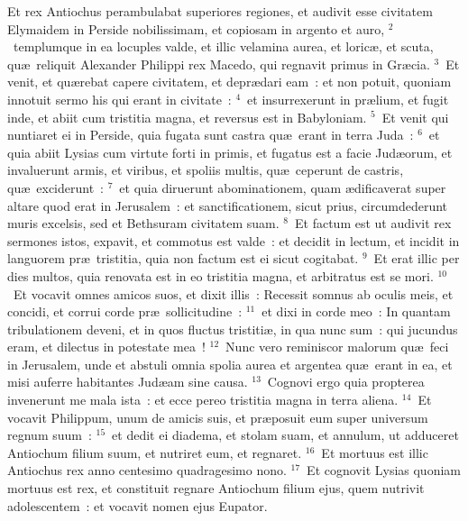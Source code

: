 \lettrine[lines=3,image=true,loversize=0.05,lraise=-0.03]{E}{}t rex Antiochus perambulabat superiores regiones, et audivit esse civitatem Elymaidem in Perside nobilissimam, et copiosam in argento et auro,
${}^{2}$~templumque in ea locuples valde, et illic velamina aurea, et loric\ae , et scuta, qu\ae\ reliquit Alexander Philippi rex Macedo, qui regnavit primus in Gr\ae cia.
${}^{3}$~Et venit, et qu\ae rebat capere civitatem, et depr\ae dari eam~: et non potuit, quoniam innotuit sermo his qui erant in civitate~:
${}^{4}$~et insurrexerunt in pr\ae lium, et fugit inde, et abiit cum tristitia magna, et reversus est in Babyloniam.
${}^{5}$~Et venit qui nuntiaret ei in Perside, quia fugata sunt castra qu\ae\ erant in terra Juda~:
${}^{6}$~et quia abiit Lysias cum virtute forti in primis, et fugatus est a facie Jud\ae orum, et invaluerunt armis, et viribus, et spoliis multis, qu\ae\ ceperunt de castris, qu\ae\ exciderunt~:
${}^{7}$~et quia diruerunt abominationem, quam \ae dificaverat super altare quod erat in Jerusalem~: et sanctificationem, sicut prius, circumdederunt muris excelsis, sed et Bethsuram civitatem suam.
${}^{8}$~Et factum est ut audivit rex sermones istos, expavit, et commotus est valde~: et decidit in lectum, et incidit in languorem pr\ae\ tristitia, quia non factum est ei sicut cogitabat.
${}^{9}$~Et erat illic per dies multos, quia renovata est in eo tristitia magna, et arbitratus est se mori.
${}^{10}$~Et vocavit omnes amicos suos, et dixit illis~: Recessit somnus ab oculis meis, et concidi, et corrui corde pr\ae\ sollicitudine~:
${}^{11}$~et dixi in corde meo~: In quantam tribulationem deveni, et in quos fluctus tristiti\ae , in qua nunc sum~: qui jucundus eram, et dilectus in potestate mea~!
${}^{12}$~Nunc vero reminiscor malorum qu\ae\ feci in Jerusalem, unde et abstuli omnia spolia aurea et argentea qu\ae\ erant in ea, et misi auferre habitantes Jud\ae am sine causa.
${}^{13}$~Cognovi ergo quia propterea invenerunt me mala ista~: et ecce pereo tristitia magna in terra aliena.
${}^{14}$~Et vocavit Philippum, unum de amicis suis, et pr\ae posuit eum super universum regnum suum~:
${}^{15}$~et dedit ei diadema, et stolam suam, et annulum, ut adduceret Antiochum filium suum, et nutriret eum, et regnaret.
${}^{16}$~Et mortuus est illic Antiochus rex anno centesimo quadragesimo nono.
${}^{17}$~Et cognovit Lysias quoniam mortuus est rex, et constituit regnare Antiochum filium ejus, quem nutrivit adolescentem~: et vocavit nomen ejus Eupator.


